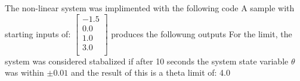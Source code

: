 The non-linear system was implimented with the following code
A sample with starting inputs of: $\begin{bmatrix}
-1.5\\
0.0\\
1.0\\
3.0\\
\end{bmatrix}
$ produces the followung outputs
For the limit, the system was considered stabalized if after 10 seconds the system state variable $\theta$ was within $\pm0.01$ and the result of this is a theta limit of: 4.0
